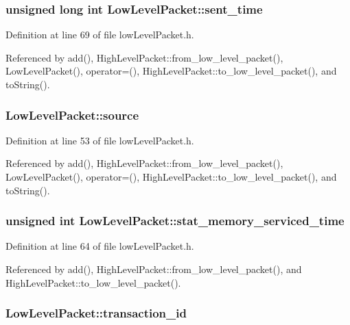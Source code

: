 \subsubsection[{sent\_\-time}]{\setlength{\rightskip}{0pt plus 5cm}unsigned long int {\bf LowLevelPacket::sent\_\-time}}\label{classLowLevelPacket_8a51892863d89c8b8b28f75c19fa0199}




Definition at line 69 of file lowLevelPacket.h.

Referenced by add(), HighLevelPacket::from\_\-low\_\-level\_\-packet(), LowLevelPacket(), operator=(), HighLevelPacket::to\_\-low\_\-level\_\-packet(), and toString().
\subsubsection[{source}]{ {\bf LowLevelPacket::source}}\label{classLowLevelPacket_c7aee6df6db0e4bb8e5be36b061a95bc}




Definition at line 53 of file lowLevelPacket.h.

Referenced by add(), HighLevelPacket::from\_\-low\_\-level\_\-packet(), LowLevelPacket(), operator=(), HighLevelPacket::to\_\-low\_\-level\_\-packet(), and toString().
\subsubsection[{stat\_\-memory\_\-serviced\_\-time}]{\setlength{\rightskip}{0pt plus 5cm}unsigned int {\bf LowLevelPacket::stat\_\-memory\_\-serviced\_\-time}}\label{classLowLevelPacket_b8f013b92fcf6f6caa2bd5c9d1cecf31}




Definition at line 64 of file lowLevelPacket.h.

Referenced by add(), HighLevelPacket::from\_\-low\_\-level\_\-packet(), and HighLevelPacket::to\_\-low\_\-level\_\-packet().
\subsubsection[{transaction\_\-id}]{ {\bf LowLevelPacket::transaction\_\-id}}\label{classLowLevelPacket_ed8dd9d70bac87be59a61fe8ac4b399d}




